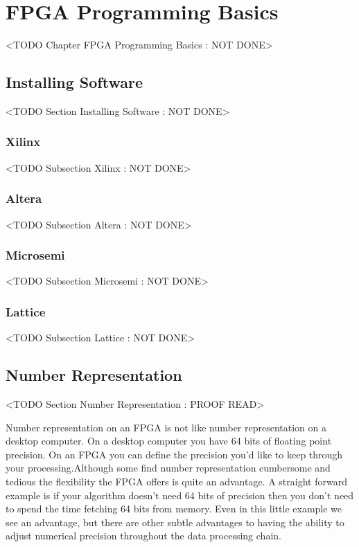 \chapter{FPGA Programming Basics}
	<TODO Chapter FPGA Programming Basics : NOT DONE>

\section{Installing Software}
	<TODO Section Installing Software : NOT DONE>

\subsection{Xilinx}
	<TODO Subsection Xilinx : NOT DONE>

\subsection{Altera}
	<TODO Subsection Altera : NOT DONE>

\subsection{Microsemi}
	<TODO Subsection Microsemi : NOT DONE>

\subsection{Lattice}
	<TODO Subsection Lattice : NOT DONE>

\section{Number Representation}
	<TODO Section Number Representation : PROOF READ>

Number representation on an \ac{FPGA} is not like number representation on a desktop computer. On a desktop computer you have 64 bits of floating point precision. On an \ac{FPGA} you can define the precision you'd like to keep through your processing.Although some find number representation cumbersome and tedious the flexibility the \ac{FPGA} offers is quite an advantage. A straight forward example is if your algorithm doesn't need 64 bits of precision then you don't need to spend the time fetching 64 bits from memory. Even in this little example we see an advantage, but there are other subtle advantages to having the ability to adjust numerical precision throughout the data processing chain.

